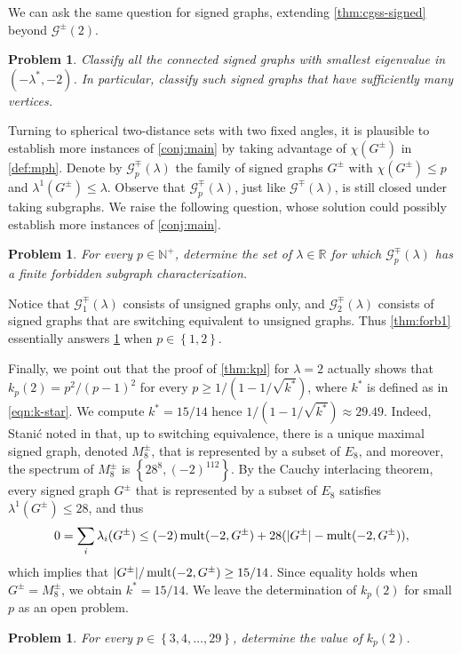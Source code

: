 \documentclass[11pt]{article}
\newtheorem{problem}[theorem]{Problem}
\theoremstyle{definition}
\theoremstyle{remark}
\DeclarePairedDelimiter\abs{\lvert}{\rvert}
\newcommand{\sset}[1]{\left\{{#1}\right\}}
\newcommand{\la}{\lambda}
\newcommand{\G}{\mathcal{G}}
\newcommand{\N}{\mathbb{N}}
\newcommand{\R}{\mathbb{R}}
\newcommand{\Gsp}{\G^\mp(\la)}
\newcommand{\mult}{\operatorname{mult}}
\begin{document}
We can ask the same question for signed graphs, extending \cref{thm:cgss-signed} beyond $\G^\pm(2)$.

\begin{problem}
    Classify all the connected signed graphs with smallest eigenvalue in $(-\la^*, -2)$. In particular, classify such signed graphs that have sufficiently many vertices.
\end{problem}

Turning to spherical two-distance sets with two fixed angles, it is plausible to establish more instances of \cref{conj:main} by taking advantage of $\chi(G^\pm)$ in \cref{def:mph}. Denote by $\G^\mp_p(\la)$ the family of signed graphs $G^\pm$ with $\chi(G^\pm) \le p$ and $\la^1(G^\pm) \le \la$. Observe that $\G^\mp_p(\la)$, just like $\Gsp$, is still closed under taking subgraphs. We raise the following question, whose solution could possibly establish more instances of \cref{conj:main}.

\begin{problem} \label{prob:d}
    For every $p \in \N^+$, determine the set of $\la \in \R$ for which $\G^\mp_p(\la)$ has a finite forbidden subgraph characterization.
\end{problem}

Notice that $\G^\mp_1(\la)$ consists of unsigned graphs only, and $\G^\mp_2(\la)$ consists of signed graphs that are switching equivalent to unsigned graphs. Thus \cref{thm:forb1} essentially answers \cref{prob:d} when $p \in \sset{1,2}$.

Finally, we point out that the proof of \cref{thm:kpl} for $\la = 2$ actually shows that $k_p(2) = p^2/(p-1)^2$ for every $p \ge 1/(1-1/\sqrt{k^*})$, where $k^*$ is defined as in \eqref{eqn:k-star}. We compute $k^* = 15/14$ hence $1/(1-1/\sqrt{k^*}) \approx 29.49$. Indeed, Stani\'{c} noted in \cite{S20} that, up to switching equivalence, there is a unique maximal signed graph, denoted $M_8^\pm$, that is represented by a subset of $E_8$, and moreover, the spectrum of $M_8^\pm$ is $\sset{28^8, (-2)^{112}}$. By the Cauchy interlacing theorem, every signed graph $G^\pm$ that is represented by a subset of $E_8$ satisfies $\la^1(G^\pm) \le 28$, and thus
\[
    0 = \sum_i \la_i(G^\pm) \le (-2)\mult(-2,G^\pm) + 28(\abs{G^\pm} - \mult(-2,G^\pm)),
\]
which implies that $\abs{G^\pm}/\mult(-2,G^\pm) \ge 15/14$. Since equality holds when $G^\pm = M_8^\pm$, we obtain $k^* = 15/14$. We leave the determination of $k_p(2)$ for small $p$ as an open problem.

\begin{problem}
    For every $p \in \sset{3,4,\dots,29}$, determine the value of $k_p(2)$.
\end{problem}
\end{document}
